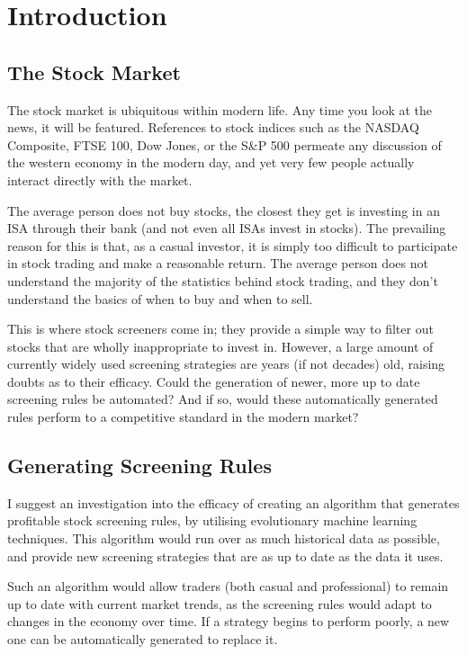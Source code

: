 \section{Introduction}
\subsection{The Stock Market}
The stock market is ubiquitous within modern life. Any time you look at the news, it will be featured. References to stock indices such as the NASDAQ Composite, FTSE 100, Dow Jones, or the S\&P 500 permeate any discussion of the western economy in the modern day, and yet very few people actually interact directly with the market. \newline

The average person does not buy stocks, the closest they get is investing in an ISA through their bank (and not even all ISAs invest in stocks). The prevailing reason for this is that, as a casual investor, it is simply too difficult to participate in stock trading and make a reasonable return. The average person does not understand the majority of the statistics behind stock trading, and they don't understand the basics of when to buy and when to sell. \newline

This is where stock screeners come in; they provide a simple way to filter out stocks that are wholly inappropriate to invest in. However, a large amount of currently widely used screening strategies are years (if not decades) old, raising doubts as to their efficacy. Could the generation of newer, more up to date screening rules be automated? And if so, would these automatically generated rules perform to a competitive standard in the modern market?

\subsection{Generating Screening Rules}
I suggest an investigation into the efficacy of creating an algorithm that generates profitable stock screening rules, by utilising evolutionary machine learning techniques. This algorithm would run over as much historical data as possible, and provide new screening strategies that are as up to date as the data it uses. \newline

Such an algorithm would allow traders (both casual and professional) to remain up to date with current market trends, as the screening rules would adapt to changes in the economy over time. If a strategy begins to perform poorly, a new one can be automatically generated to replace it. \newline


